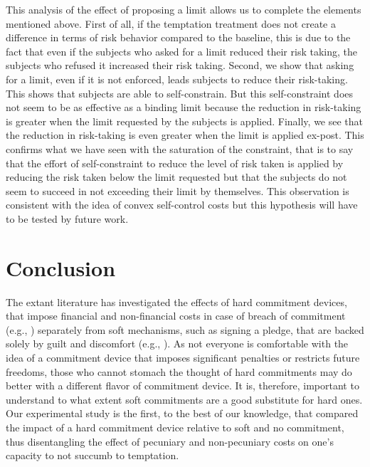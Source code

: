 \documentclass[
]{book}
\begin{document}
This analysis of the effect of proposing a limit allows us to complete the
elements mentioned above.
First of all, if the temptation treatment does not create a difference in terms
of risk behavior compared to the baseline, this is due to the fact that even if
the subjects who asked for a limit reduced their risk taking, the subjects who
refused it increased their risk taking.
Second, we show that asking for a limit, even if it is not enforced, leads
subjects to reduce their risk-taking.
This shows that subjects are able to self-constrain.
But this self-constraint does not seem to be as effective as a binding limit
because the reduction in risk-taking is greater when the limit requested by the
subjects is applied.
Finally, we see that the reduction in risk-taking is even greater when the limit
is applied ex-post.
This confirms what we have seen with the saturation of the constraint, that is
to say that the effort of self-constraint to reduce the level of risk taken is
applied by reducing the risk taken below the limit requested but that the
subjects do not seem to succeed in not exceeding their limit by themselves.
This observation is consistent with the idea of convex self-control costs but
this hypothesis will have to be tested by future work.

\hypertarget{discu2}{%
\section{Conclusion}\label{discu2}}

The extant literature has investigated the effects of hard commitment devices,
that impose financial and non-financial costs in case of breach of commitment
(e.g., \citet{ashraf2006tying}) separately from soft mechanisms, such as signing a
pledge, that are backed solely by guilt and discomfort (e.g., \citet{bhanot2017cheap}).
As not everyone is comfortable with the idea of a commitment device that imposes
significant penalties or restricts future freedoms, those who cannot stomach the
thought of hard commitments may do better with a different flavor of commitment
device.
It is, therefore, important to understand to what extent soft commitments are a
good substitute for hard ones.
Our experimental study is the first, to the best of our knowledge, that compared
the impact of a hard commitment device relative to soft and no commitment, thus
disentangling the effect of pecuniary and non-pecuniary costs on one's capacity
to not succumb to temptation.
\end{document}
